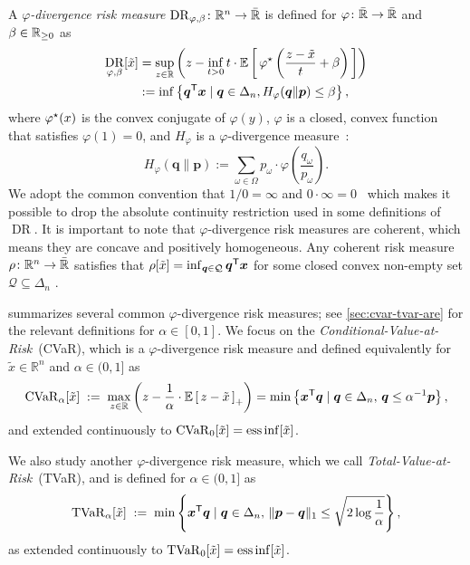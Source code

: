 \documentclass[10pt]{article} %
\DeclareMathOperator{\ER}{DR}
\DeclareMathOperator{\ess}{ess}
\renewcommand{\cite}{\citep}
\begin{document}
A \emph{$\varphi$-divergence risk measure} $\ER_{\varphi, \beta }\colon \mathbb{R}^n \to  \bar{\Real}$ is defined for $\varphi\colon \bar{\mathbb{R}} \to \bar{\mathbb{R}}$ and $\beta\in \mathbb{R}_{\ge 0}$ as~\cite{Ahmadi-Javid2012}
\begin{align} 
  \ER_{\varphi, \beta}[ \tilde{x} ]
  \label{eq:fdiv-dual}
  &= \sup_{z\in \Real} \left(  z - \inf_{t>0} t\cdot \E { \varphi\opt \left( \frac{z - \tilde{x}}{t} + \beta \right)} \right)
  \\
\label{eq:fdiv-primal}
  &:= \inf \left\{\bm{q}\tr \bm{x} \mid \bm{q}\in \Delta_n, H_{\varphi}(\bm{q} \| \bm{p}) \le \beta
    \right\}
    ,
\end{align}
where $\varphi^{\mathnormal{\star}}(x)$ is the convex conjugate of $\varphi(y)$, $\varphi$ is a closed, convex function that satisfies $\varphi(1) = 0$, and $H_{\varphi}$ is a $\varphi$-divergence measure~\cite{Bayraksan2015}:
\[
  H_\varphi(\bm{q} \| \bm{p}) := \sum_{\omega \in \Omega} p_{\omega} \cdot \varphi\left(\frac{q_{\omega}}{p_{\omega}}\right).
\]
We adopt the common convention that $1 / 0 = \infty$ and $0 \cdot \infty = 0$~\cite{rockefeller1996variational} which makes it possible to drop the absolute continuity restriction used in some definitions of $\ER$. It is important to note that $\varphi$-divergence risk measures are coherent, which means they are concave and positively homogeneous. Any coherent risk measure $\rho\colon \mathbb{R}^n\to \bar{\mathbb{R}}$ satisfies that $\rho[\tilde{x}] = \inf_{\bm{q}\in\mathcal{Q}} \bm{q}^{\mathsf{T}}\bm{x}$ for some closed convex non-empty set $\mathcal{Q} \subseteq \Delta_n$ \citep[Prop. 2.84]{Follmer2016}. 

 summarizes several common $\varphi$-divergence risk measures; see \cref{sec:cvar-tvar-are} for the relevant definitions for $\alpha\in [0,1]$. We focus on the \emph{Conditional-Value-at-Risk}~(CVaR), which is a $\varphi$-divergence risk measure and defined equivalently for $\tilde{x} \in \mathbb{R}^n$ and $\alpha \in (0,1]$ as~\cite{Follmer2016}
\begin{equation} \label{eq:primal_cvar}
    \operatorname{CVaR}_\alpha[ \tilde{x} ]
    \; :=\; 
    \max_{z \in \mathbb{R}} \left(z - \frac{1}{\alpha} \cdot \mathbb{E}\left[\, z -\tilde{x} \,\right]_+\right)
    = 
\min \left\{ \bm{x}^{\mathsf{T}} \bm{q} \mid \bm{q} \in \Delta_{n}, \, \bm{q} \le \alpha^{-1} \bm{p}
\right\},
\end{equation}
and extended continuously to $\cvaro_0[\tilde{x}] = \ess\inf[\tilde{x}]$.

We also study another $\varphi$-divergence risk measure, which we call \emph{Total-Value-at-Risk}~(TVaR), and is defined for $\alpha\in (0,1]$ as
\begin{equation} \label{eq:tvar-dual}
  \operatorname{TVaR}_{\alpha}[\tilde{x}]
  \;:=\; 
\min \left\{ \bm{x}^{\mathsf{T}} \bm{q} \mid \bm{q} \in \Delta_{n}, \, \|\bm{p} - \bm{q}\|_1 \le \sqrt{2 \log \frac{1}{\alpha }}
\right\},
\end{equation}
as extended continuously to $\tvaro_{0}[\tilde{x}] = \ess\inf [\tilde{x}]$.
\end{document}
